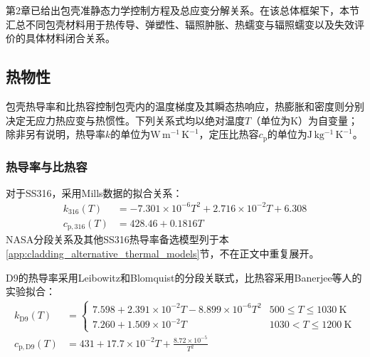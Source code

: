 第2章已给出包壳准静态力学控制方程及总应变分解关系。在该总体框架下，本节汇总不同包壳材料用于热传导、弹塑性、辐照肿胀、热蠕变与辐照蠕变以及失效评价的具体材料闭合关系。

\subsection{热物性}
\label{sec:cladding_thermophysical_properties}

包壳热导率和比热容控制包壳内的温度梯度及其瞬态热响应，热膨胀和密度则分别决定无应力热应变与热惯性。下列关系式均以绝对温度$T$（单位为$\mathrm{K}$）为自变量；除非另有说明，热导率$k$的单位为$\mathrm{W\,m^{-1}\,K^{-1}}$，定压比热容$c_{\mathrm p}$的单位为$\mathrm{J\,kg^{-1}\,K^{-1}}$。

\subsubsection{热导率与比热容}

对于SS316，采用Mills数据的拟合关系\cite{mills2002,halesBISONTheoryManual2016}：
\begin{subequations}\label{eq:ss316_thermal_properties}
	\begin{align}
		k_{316}(T)
		&=-7.301\times10^{-6}T^2
		+2.716\times10^{-2}T+6.308
		\label{eq:ss316_thermal_conductivity}\\
		c_{\mathrm p,316}(T)
		&=428.46+0.1816T
		\label{eq:ss316_specific_heat}
	\end{align}
\end{subequations}
NASA分段关系及其他SS316热导率备选模型列于本\ref{app:cladding_alternative_thermal_models}节，不在正文中重复展开。

D9的热导率采用Leibowitz和Blomquist的分段关联式，比热容采用Banerjee等人的实验拟合\cite{Leibowitz_1988,banerjee2007_d9cp}：
\begin{subequations}\label{eq:d9_thermal_properties}
	\begin{align}
		k_{\mathrm{D9}}(T)
		&=
		\begin{cases}
			7.598+2.391\times10^{-2}T-8.899\times10^{-6}T^2
			&500\leq T\leq1030\ \mathrm{K}\\
			7.260+1.509\times10^{-2}T
			&1030<T\leq1200\ \mathrm{K}
		\end{cases}
		\label{eq:d9_thermal_conductivity}\\
		c_{\mathrm p,\mathrm{D9}}(T)
		&=431+17.7\times10^{-2}T
		+\frac{8.72\times10^{-5}}{T^2}
		\label{eq:d9_specific_heat}
	\end{align}
\end{subequations}


